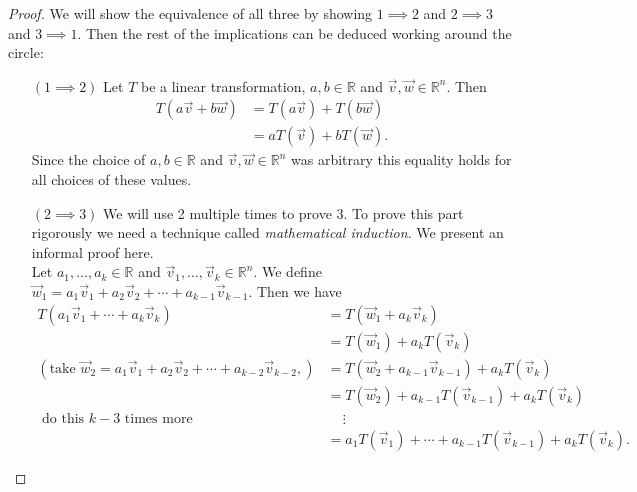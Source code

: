 \begin{proof}
We will show the equivalence of all three by showing $1 \implies 2$ and 
$2 \implies 3$ and $3 \implies 1$. 
Then the rest of the implications can be deduced working around the circle:\\
\begin{center}
\end{center}
\begin{enumerate}
\item[$(1 \implies 2)$] Let $T$ be a linear transformation, 
$a,b \in \mathbb{R}$ and $\vec{v},\vec{w} \in \mathbb{R}^n$. Then
\begin{align*}
T(a\vec{v}+b\vec{w}) &= T(a\vec{v})+T(b\vec{w})\\
&= aT(\vec{v})+bT(\vec{w}).
\end{align*}
Since the choice of $a,b \in \mathbb{R}$ and $\vec{v},\vec{w} \in \mathbb{R}^n$
was arbitrary this equality holds for all choices of these values.

\item[$(2 \implies 3)$] We will use 2 multiple times to prove 3. 
To prove this part rigorously we need a technique 
called \textit{mathematical induction}. We present an informal proof here. \\

Let $a_1, \ldots, a_k \in \mathbb{R}$ and 
$\vec{v}_1,\ldots,\vec{v}_k \in \mathbb{R}^n$. We define 
$\vec{w}_1= a_1\vec{v}_1+a_2\vec{v}_2+\cdots+a_{k-1}\vec{v}_{k-1}$. Then we 
have 
\begin{align*}
T(a_1\vec{v}_1+\cdots+a_k\vec{v}_k)
&=T(\vec{w}_1+a_k\vec{v}_k)\\
&=T(\vec{w}_1)+a_{k}T(\vec{v}_k)\\
(\text{take }\vec{w}_2=a_1\vec{v}_1+a_2\vec{v}_2+\cdots+a_{k-2}\vec{v}_{k-2}, 
)&= T(\vec{w}_2+a_{k-1}\vec{v}_{k-1})+a_{k}T(\vec{v}_k)\\
&=T(\vec{w}_2)+a_{k-1}T(\vec{v}_{k-1})+a_{k}T(\vec{v}_k)\\
\text{ do this } k-3 \text{ times more } & \phantom{xx} \vdots \\
&=a_1T(\vec{v} _1)+\cdots+a_{k-1}T(\vec{v}_{k-1})+a_kT(\vec{v}_k).
\end{align*}


\end{enumerate}
\end{proof}

